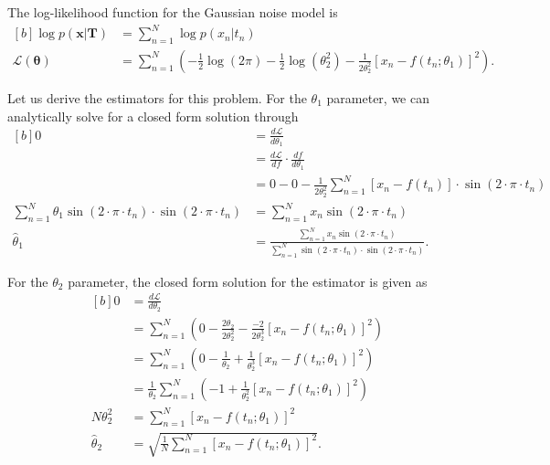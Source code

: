 \documentclass{article}
\begin{document}
The log-likelihood function for the Gaussian noise model is
\begin{equation}
\begin{aligned}[b]
\log p(\mathbf{x} \vert \mathbf{T}) &= \sum_{n=1}^{N} \log  p(x_n \vert t_n) \\
\mathcal{L}(\boldsymbol\theta) &= \sum_{n=1}^{N} \left( -\frac{1}{2}\log \left( 2\pi \right) -\frac{1}{2}\log \left( \theta_2^2 \right) - \frac{1}{2\theta_2^2} \left[ x_n - f(t_n;\theta_1)\right] ^2 \right).
\end{aligned}
\end{equation}

Let us derive the estimators for this problem. For the $\theta_1$ parameter, we can analytically solve for a closed form solution through
\begin{equation}
\begin{aligned}[b]
0 &= \frac{d\mathcal{L}}{d\theta_1} \\
&= \frac{d\mathcal{L}}{df} \cdot \frac{df}{d\theta_1} \\
&= 0 - 0 -\frac{1}{2\theta_2^2} \sum_{n=1}^{N} \left[x_n - f(t_n)\right]\cdot \sin \left(2 \cdot \pi \cdot t_n \right) \\
\sum_{n=1}^{N} \theta_1 \sin \left(2 \cdot \pi \cdot t_n \right)\cdot \sin \left(2 \cdot \pi \cdot t_n \right) &=  \sum_{n=1}^{N} x_n \sin \left(2 \cdot \pi \cdot t_n \right) \\
\hat{\theta}_1 &= \frac{\sum_{n=1}^{N} x_n \sin \left(2 \cdot \pi \cdot t_n \right)}{\sum_{n=1}^{N} \sin \left(2 \cdot \pi \cdot t_n \right)\cdot \sin \left(2 \cdot \pi \cdot t_n \right)}.
\end{aligned}
\end{equation}

For the $\theta_2$ parameter, the closed form solution for the estimator is given as
\begin{equation}
\begin{aligned}[b]
0 &= \frac{d\mathcal{L}}{d\theta_2} \\
&= \sum_{n=1}^{N} \left( 0 -\frac{2\theta_2}{2\theta_2^2} -\frac{-2}{2\theta_2^3}\left[ x_n - f(t_n;\theta_1)\right]^2 \right) \\
&= \sum_{n=1}^{N} \left( 0 - \frac{1}{\theta_2} + \frac{1}{\theta_2^3}\left[ x_n - f(t_n;\theta_1)\right]^2  \right) \\
&= \frac{1}{\theta_2} \sum_{n=1}^{N} \left( - 1 + \frac{1}{\theta_2^2}\left[ x_n - f(t_n;\theta_1)\right]^2  \right) \\
N \theta_2^2 &= \sum_{n=1}^{N}\left[ x_n - f(t_n;\theta_1)\right]^2 \\
\hat{\theta}_2 &= \sqrt{\frac{1}{N}\sum_{n=1}^{N}\left[ x_n - f(t_n;\theta_1)\right]^2}.
\end{aligned}
\end{equation}
\end{document}
